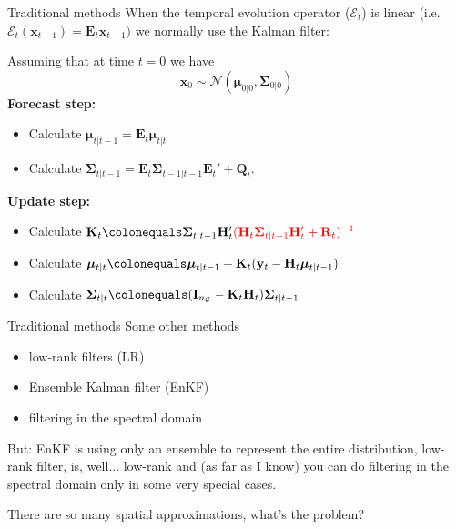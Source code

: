 \documentclass{beamer}
\newcommand{\bx}{\mathbf{x}}
\newcommand{\by}{\mathbf{y}}
\newcommand{\bE}{\mathbf{E}}
\newcommand{\bI}{\mathbf{I}}
\newcommand{\bH}{\mathbf{H}}
\newcommand{\bK}{\mathbf{K}}
\newcommand{\bQ}{\mathbf{Q}}
\newcommand{\bR}{\mathbf{R}}
\newcommand{\bfmu}{\bm{\mu}}
\newcommand{\bfSigma}{\bm{\Sigma}}
\newcommand{\normal}{\mathcal{N}}
\newcommand{\grid}{\mathcal{G}}
\begin{document}
\begin{frame}{Traditional methods}
When the temporal evolution operator ($\mathcal{E}_t$) is linear (i.e. $\mathcal{E}_t(\bx_{t-1}) = \bE_t\bx_{t-1})$ we normally use the Kalman filter:

Assuming that at time $t=0$ we have 
$$\bx_0 \sim \normal(\bfmu_{0|0}, \bfSigma_{0|0})$$
\textbf{Forecast step:}
\begin{itemize}
    \item Calculate $\bfmu_{t|t-1} = \bE_t \bfmu_{t|t}$
    \item Calculate $\bfSigma_{t|t-1} = \bE_t \bfSigma_{t-1|t-1} \bE_t' + \bQ_t$.
\end{itemize}
\textbf{Update step:}
\begin{itemize}
    \item Calculate $\bK_t \colonequals \bfSigma_{t|t-1}\bH_t'\color{red}(\bH_t\bfSigma_{t|t-1} \bH_t'+\bR_t)^{-1}$
    \item Calculate $\bfmu_{t|t} \colonequals \bfmu_{t|t-1} + \bK_t(\by_t - \bH_t \bfmu_{t|t-1})$
    \item Calculate $\bfSigma_{t|t} \colonequals (\bI_{n_\grid} - \bK_t \bH_t) \bfSigma_{t|t-1}$
\end{itemize}
\end{frame}


\begin{frame}{Traditional methods}
    Some other methods
    \begin{itemize}
        \item low-rank filters (LR)
        \item Ensemble Kalman filter (EnKF)
        \item filtering in the spectral domain
    \end{itemize}

\vspace{0.5cm}
But: EnKF is using only an ensemble to represent the entire distribution, low-rank filter, is, well... low-rank and (as far as I know) you can do filtering in the spectral domain only in some very special cases.

\vspace{0.5cm}
There are so many spatial approximations, what's the problem?
\end{frame}
\end{document}
